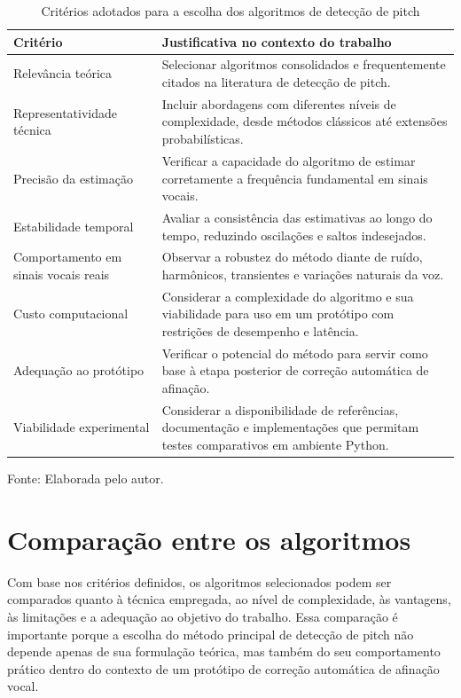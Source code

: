 \begin{table}[H]
\centering
\caption{Critérios adotados para a escolha dos algoritmos de detecção de pitch}
\begin{tabular}{|p{4.2cm}|p{9.5cm}|}
\hline
\textbf{Critério} & \textbf{Justificativa no contexto do trabalho} \\
\hline
Relevância teórica & Selecionar algoritmos consolidados e frequentemente citados na literatura de detecção de pitch. \\
\hline
Representatividade técnica & Incluir abordagens com diferentes níveis de complexidade, desde métodos clássicos até extensões probabilísticas. \\
\hline
Precisão da estimação & Verificar a capacidade do algoritmo de estimar corretamente a frequência fundamental em sinais vocais. \\
\hline
Estabilidade temporal & Avaliar a consistência das estimativas ao longo do tempo, reduzindo oscilações e saltos indesejados. \\
\hline
Comportamento em sinais vocais reais & Observar a robustez do método diante de ruído, harmônicos, transientes e variações naturais da voz. \\
\hline
Custo computacional & Considerar a complexidade do algoritmo e sua viabilidade para uso em um protótipo com restrições de desempenho e latência. \\
\hline
Adequação ao protótipo & Verificar o potencial do método para servir como base à etapa posterior de correção automática de afinação. \\
\hline
Viabilidade experimental & Considerar a disponibilidade de referências, documentação e implementações que permitam testes comparativos em ambiente Python. \\
\hline
\end{tabular}
\small Fonte: Elaborada pelo autor.
\end{table}

\section{Comparação entre os algoritmos}

Com base nos critérios definidos, os algoritmos selecionados podem ser comparados quanto à técnica empregada, ao nível de complexidade, às vantagens, às limitações e a adequação ao objetivo do trabalho. Essa comparação é importante porque a escolha do método principal de detecção de pitch não depende apenas de sua formulação teórica, mas também do seu comportamento prático dentro do contexto de um protótipo de correção automática de afinação vocal.

